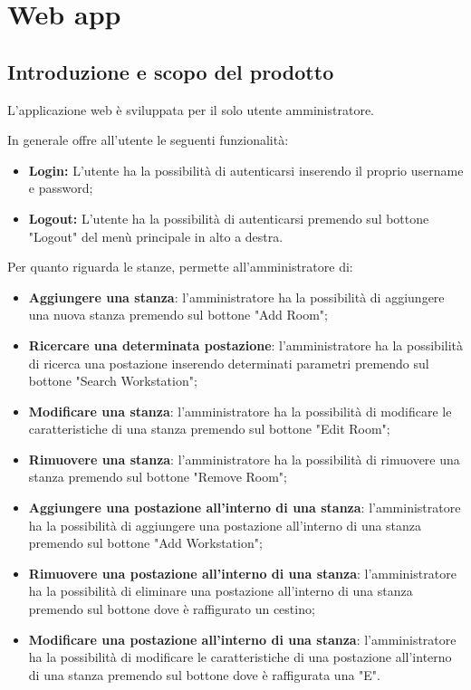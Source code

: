 \section{Web app}

\subsection{Introduzione e scopo del prodotto}
L'applicazione web è sviluppata per il solo utente amministratore.

In generale offre all'utente le seguenti funzionalità:
\begin{itemize}
	\item \textbf{Login:} L'utente ha la possibilità di autenticarsi inserendo il proprio username e password; \\
	\item \textbf{Logout:} L'utente ha la possibilità di autenticarsi premendo sul bottone "Logout" del menù principale in alto a destra. \\
\end{itemize}
Per quanto riguarda le stanze, permette all'amministratore di:
\begin{itemize}
	\item \textbf{Aggiungere una stanza}: l'amministratore ha la possibilità di aggiungere una nuova stanza premendo sul bottone "Add Room"; \\
	\item \textbf{Ricercare una determinata postazione}: l'amministratore ha la possibilità di ricerca una postazione inserendo determinati parametri premendo sul bottone "Search Workstation"; \\
	\item \textbf{Modificare una stanza}: l'amministratore ha la possibilità di modificare le caratteristiche di una stanza premendo sul bottone "Edit Room"; \\
	\item \textbf{Rimuovere una stanza}: l'amministratore ha la possibilità di rimuovere una stanza premendo sul bottone "Remove Room"; \\
	\item \textbf{Aggiungere una postazione all'interno di una stanza}: l'amministratore ha la possibilità di aggiungere una postazione all'interno di una stanza premendo sul bottone "Add Workstation"; \\
	\item \textbf{Rimuovere una postazione all'interno di una stanza}: l'amministratore ha la possibilità di eliminare una postazione all'interno di una stanza premendo sul bottone dove è raffigurato un cestino; \\
	\item \textbf{Modificare una postazione all'interno di una stanza}:  l'amministratore ha la possibilità di modificare le caratteristiche di una postazione all'interno di una stanza premendo sul bottone dove è raffigurata una "E". \\
\end{itemize}
